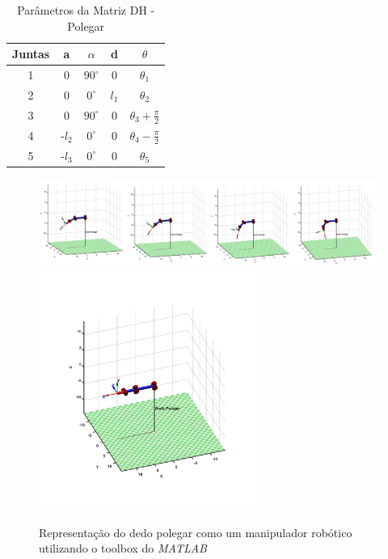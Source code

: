 \begin{table}[H]
\centering
\caption{Parâmetros da Matriz DH - Polegar}
\label{DHPolegar}
\begin{tabular}{|c|c|c|c|c|}
	\hline
    Juntas & a & $\alpha$ & d & $\theta$ \\ \hline
    1 & 0 & $90^\circ$ & 0 & $\theta_1$ \\ \hline
    2 & 0 & $0^\circ$ & $l_1$ & $\theta_2$ \\ \hline
    3 & 0 & $90^\circ$ & 0 & $\theta_3 + \frac{\pi}{2}$  \\ \hline
    4 & -$l_2$ & $0^\circ$ & 0 & $\theta_4 - \frac{\pi}{2}$ \\ \hline
    5 & -$l_3$ & $0^\circ$ & 0 & $\theta_5$ \\
	\hline
\end{tabular}
\end{table}

\begin{figure}[H]
\centering
\includegraphics[width = 1\textwidth]{img/Polegartotal.png}
\includegraphics[width = 0.65\textwidth]{img/Polegar1.JPG}
\caption[Representação do dedo polegar como um manipulador robótico]{Representação do dedo polegar como um manipulador robótico utilizando o toolbox do \textit{MATLAB} \cite{corke1996robotics}}
\label{JuntasPolegar}
\end{figure}

